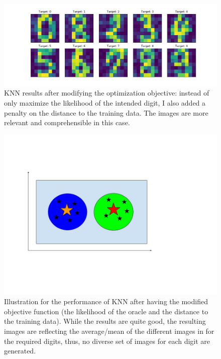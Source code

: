     \begin{figure}
      \centering
      \includegraphics[scale=0.5]{images/adv_attack/KNN_modified.png}
      \caption{KNN results after modifying the optimization objective: instead of only maximize the likelihood of the intended digit, I also added a penalty on the distance to the training data. The images are more relevant and comprehensible in this case.}
      \label{fig:knn_results_2}
    \end{figure}

    \begin{figure}
      \centering
      \includegraphics[scale=0.5]{images/adv_attack/kNN_visualization_with_new_loss.jpg}
      \caption{Illustration for the performance of KNN after having the modified objective function (the likelihood of the oracle and the distance to the training data). While the results are quite good, the resulting images are reflecting the average/mean of the different images in for the required digits, thus, no diverse set of images for each digit are generated.}
      \label{fig:knn_illustration_2}
    \end{figure}

